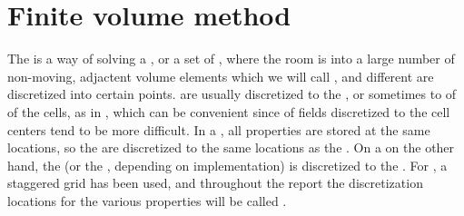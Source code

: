 \chapter{Finite volume method}






\newabbrev{\textgammapath}{\mbox{$\gammapath$}}

The \FVM is a way of solving a \PDE, or a set of \PDEs, where the room is \discretized into a large number of non-moving, adjactent volume elements which we will call \cells, and different \properties are discretized into certain points.  are usually discretized to the , or sometimes to  of  of the cells, as in \citep{Losasso2004}, which can be convenient since \interpolation of fields discretized to the cell centers tend to be more difficult. In a , all properties are stored at the same locations, so the  are discretized to the same locations as the . On a  on the other hand, the \velocity (or the \momentum, depending on implementation) is discretized to the . For \thiswork, a staggered grid has been used, and throughout the report the discretization locations for the various properties will be called .

